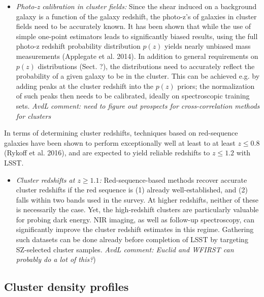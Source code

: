 \begin{itemize}
\item {\it Photo-z calibration in cluster fields:} Since the shear induced on a background galaxy is a function of the galaxy redshift, the photo-z's of galaxies in cluster fields need to be accurately known.  It has been shown that while the use of simple one-point estimators leads to significantly biased results, using the full photo-z redshift probability distribution $p(z)$ yields nearly unbiased mass measurements (Applegate et al. 2014).  In addition to general requirements on $p(z)$ distributions (Sect. ?), the distributions need to accurately reflect the probability of a given galaxy to be in the cluster.  This can be achieved e.g. by adding peaks at the cluster redshift into the $p(z)$ priors; the normalization of such peaks then needs to be calibrated, ideally on spectroscopic training sets. {\it AvdL comment: need to figure out prospects for cross-correlation methods for clusters}
\end{itemize}


In terms of determining cluster redshifts, techniques based on red-sequence galaxies have been shown to perform exceptionally well at least to at least $z\le0.8$ (Rykoff et al. 2016), and are expected to yield reliable redshifts to $z\le1.2$ with LSST. 
\begin{itemize}
\item {\it Cluster redshifts at $z\ge1.1$:} Red-sequence-based methods recover accurate cluster redshifts if the red sequence is (1) already well-established, and (2) falls within two bands used in the survey. At higher redshifts, neither of these is necessarily the case.  Yet, the high-redshift clusters are particularly valuable for probing dark energy.  NIR imaging, as well as follow-up spectroscopy, can significantly improve the cluster redshift estimates in this regime.  Gathering such datasets can be done already before completion of LSST by targeting SZ-selected cluster samples.  {\it AvdL comment: Euclid and WFIRST can probably do a lot of this?})
\end{itemize}


\subsection{Cluster density profiles}

